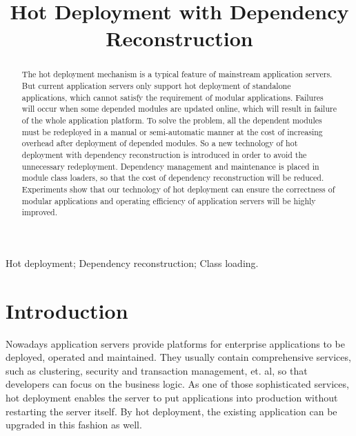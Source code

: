 \documentclass[conference]{IEEEtran}
\begin{document}
\title{Hot Deployment with Dependency Reconstruction}

\author{
}

\maketitle


\begin{abstract}
The hot deployment mechanism is a typical feature of mainstream application servers. 
But current application servers only support hot deployment of standalone applications, which cannot satisfy the requirement of modular applications. 
Failures will occur when some depended modules are updated online, which will result in failure of the whole application platform.
To solve the problem, all the dependent modules must be redeployed in a manual or semi-automatic manner at the cost of increasing overhead after deployment of depended modules.
So a new technology of hot deployment with dependency reconstruction is introduced in order to avoid the unnecessary redeployment.
Dependency management and maintenance is placed in module class loaders, so that the cost of dependency reconstruction will be reduced.
Experiments show that our technology of hot deployment can ensure the correctness of modular applications and operating efficiency of application servers will be highly improved.
\end{abstract}

\begin{IEEEkeywords}
Hot deployment; Dependency reconstruction; Class loading.
\end{IEEEkeywords}


\IEEEpeerreviewmaketitle


\section{Introduction\label{sec:introduction}}

Nowadays application servers\cite{app_server} provide platforms for enterprise applications to be deployed, operated and maintained. They usually contain comprehensive services, such as clustering, security and transaction management, et. al, so that developers can focus on the business logic. As one of those sophisticated services, hot deployment enables the server to put applications into production without restarting the server itself. By hot deployment, the existing application can be upgraded in this fashion as well.
\end{document}
